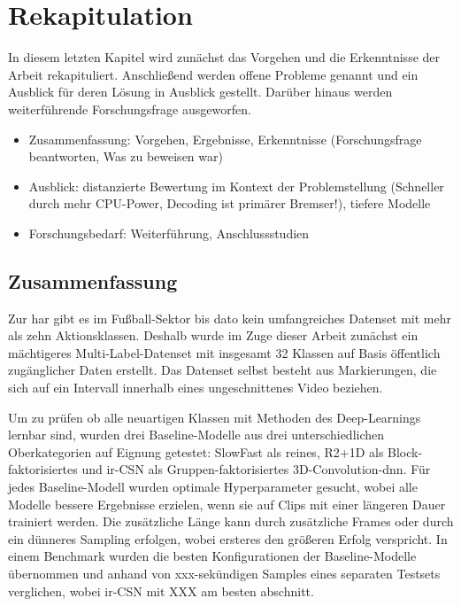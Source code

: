 \chapter{Rekapitulation}
\label{ch:zusammenfassung}

In diesem letzten Kapitel wird zunächst das Vorgehen und die Erkenntnisse der Arbeit rekapituliert.
Anschließend werden offene Probleme genannt und ein Ausblick für deren Lösung in Ausblick gestellt.
Darüber hinaus werden weiterführende Forschungsfrage ausgeworfen.

\begin{tcolorbox}[title=WIP]
 \begin{itemize}
  \item Zusammenfassung: Vorgehen, Ergebnisse, Erkenntnisse (Forschungsfrage beantworten, Was zu beweisen war)
  \item Ausblick: distanzierte Bewertung im Kontext der Problemstellung (Schneller durch mehr CPU-Power, Decoding ist primärer Bremser!), tiefere Modelle
  \item Forschungsbedarf: Weiterführung, Anschlussstudien
 \end{itemize}
 \end{tcolorbox}

\section{Zusammenfassung}
\label{sec:rekapitulation}

Zur \gls{har} gibt es im Fußball-Sektor bis dato kein umfangreiches Datenset mit mehr als zehn Aktionsklassen.
Deshalb wurde im Zuge dieser Arbeit zunächst ein mächtigeres Multi-Label-Datenset mit insgesamt 32 Klassen auf Basis öffentlich zugänglicher Daten erstellt.
Das Datenset selbst besteht aus Markierungen, die sich auf ein Intervall innerhalb eines ungeschnittenes Video beziehen.

Um zu prüfen ob alle neuartigen Klassen mit Methoden des Deep-Learnings lernbar sind, wurden drei Baseline-Modelle aus drei unterschiedlichen Oberkategorien auf Eignung getestet:
SlowFast als reines, R2+1D als Block-faktorisiertes und ir-CSN als Gruppen-faktorisiertes 3D-Convolution-\gls{dnn}.
Für jedes Baseline-Modell wurden optimale Hyperparameter gesucht, wobei alle Modelle bessere Ergebnisse erzielen, wenn sie auf Clips mit einer längeren Dauer trainiert werden.
Die zusätzliche Länge kann durch zusätzliche Frames oder durch ein dünneres Sampling erfolgen, wobei ersteres den größeren Erfolg verspricht.
In einem Benchmark wurden die besten Konfigurationen der Baseline-Modelle übernommen und anhand von xxx-sekündigen Samples eines separaten Testsets verglichen, wobei ir-CSN mit XXX am besten abschnitt.

